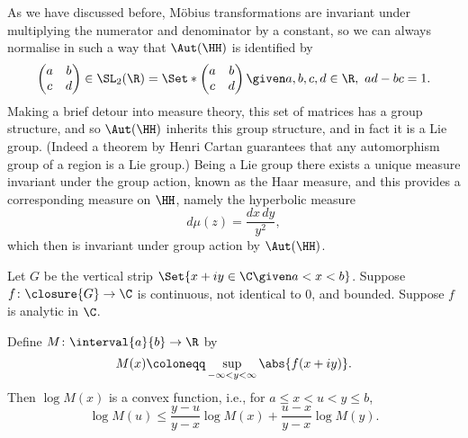 As we have discussed before, Möbius transformations are invariant under multiplying the numerator and denominator by a constant, so we can always normalise in such a way that $\Aut(\HH)$ is identified by
\[
	\begin{pmatrix}
		a & b \\
		c & d
	\end{pmatrix}
	\in \SL_2(\R) = \Set*{\begin{pmatrix} a & b \\ c & d \end{pmatrix} \given a, b, c, d \in \R,~ a d - b c = 1}.
\]
Making a brief detour into measure theory, this set of matrices has a group structure, and so $\Aut(\HH)$ inherits this group structure, and in fact it is a Lie group.
(Indeed a theorem by Henri Cartan guarantees that any automorphism group of a region is a Lie group.)
Being a Lie group there exists a unique measure invariant under the group action, known as the Haar measure, and this provides a corresponding measure on $\HH$, namely the hyperbolic measure
\[
	d \mu(z) = \frac{d x \, d y}{y^2},
\]
which then is invariant under group action by $\Aut(\HH)$.

\begin{theorem}\label{thm6.6}
	Let $G$ be the vertical strip $\Set{x + i y \in \C \given a < x < b}$.
	Suppose $f \colon \closure{G} \to \C$ is continuous, not identical to $0$, and bounded.
	Suppose $f$ is analytic in $\C$.

	Define $M \colon \interval{a}{b} \to \R$ by
	\[
		M(x) \coloneqq \sup_{-\infty < y < \infty} \abs{f(x + i y)}.
	\]
	Then $\log M(x)$ is a convex function, i.e., for $a \leq x < u < y \leq b$,
	\[
		\log M(u) \leq \frac{y - u}{y - x} \log M(x) + \frac{u - x}{y - x} \log M(y).
	\]
\end{theorem}
